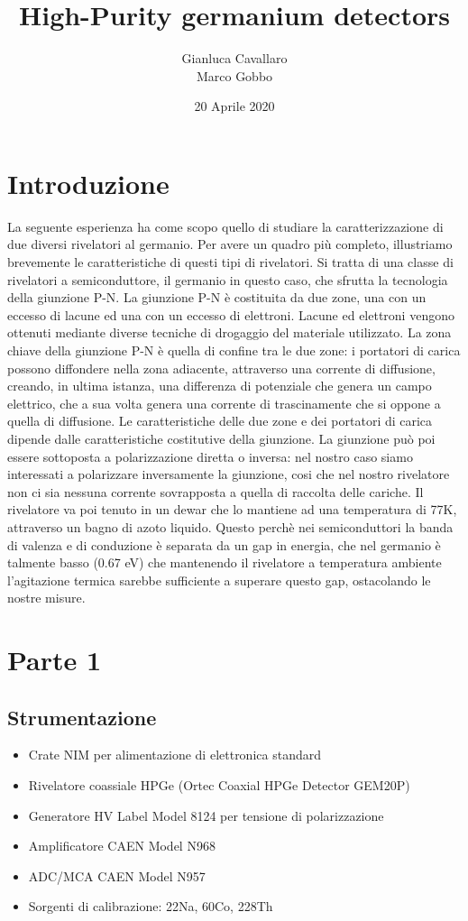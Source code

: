 \documentclass[a4paper,10pt]{article}
\title{High-Purity germanium detectors}
\author{Gianluca Cavallaro \\ Marco Gobbo}
\date{20 Aprile 2020}
\begin{document}
\maketitle
\section{Introduzione}
La seguente esperienza ha come scopo quello di studiare la caratterizzazione di due diversi rivelatori al germanio. Per avere un quadro più completo, illustriamo brevemente le caratteristiche di questi tipi di rivelatori. Si tratta di una classe di rivelatori a semiconduttore, il germanio in questo caso, che sfrutta la tecnologia della giunzione P-N. La giunzione P-N è costituita da due zone, una con un eccesso di lacune ed una con un eccesso di elettroni. Lacune ed elettroni vengono ottenuti mediante diverse tecniche di drogaggio del materiale utilizzato. La zona chiave della giunzione P-N è quella di confine tra le due zone: i portatori di carica possono diffondere nella zona adiacente, attraverso una corrente di diffusione, creando, in ultima istanza, una differenza di potenziale che genera un campo elettrico, che a sua volta genera una corrente di trascinamente che si oppone a quella di diffusione. Le caratteristiche delle due zone e dei portatori di carica dipende dalle caratteristiche costitutive della giunzione. La giunzione può poi essere sottoposta a polarizzazione diretta o inversa: nel nostro caso siamo interessati a polarizzare inversamente la giunzione, cosi che nel nostro rivelatore non ci sia nessuna corrente sovrapposta a quella di raccolta delle cariche. Il rivelatore va poi tenuto in un dewar che lo mantiene ad una temperatura di 77K, attraverso un bagno di azoto liquido. Questo perchè nei semiconduttori la banda di valenza e di conduzione è separata da un gap in energia, che nel germanio è talmente basso (0.67 eV) che mantenendo il rivelatore a temperatura ambiente l'agitazione termica sarebbe sufficiente a superare questo gap, ostacolando le nostre misure.
\section{Parte 1}
\subsection{Strumentazione}
\begin{itemize}
\item Crate NIM per alimentazione di elettronica standard
\item Rivelatore coassiale HPGe (Ortec Coaxial HPGe Detector GEM20P)
\item Generatore HV Label Model 8124 per tensione di polarizzazione
\item Amplificatore CAEN Model N968
\item ADC/MCA CAEN Model N957
\item Sorgenti di calibrazione: 22Na, 60Co, 228Th
\end{itemize}
\end{document}
